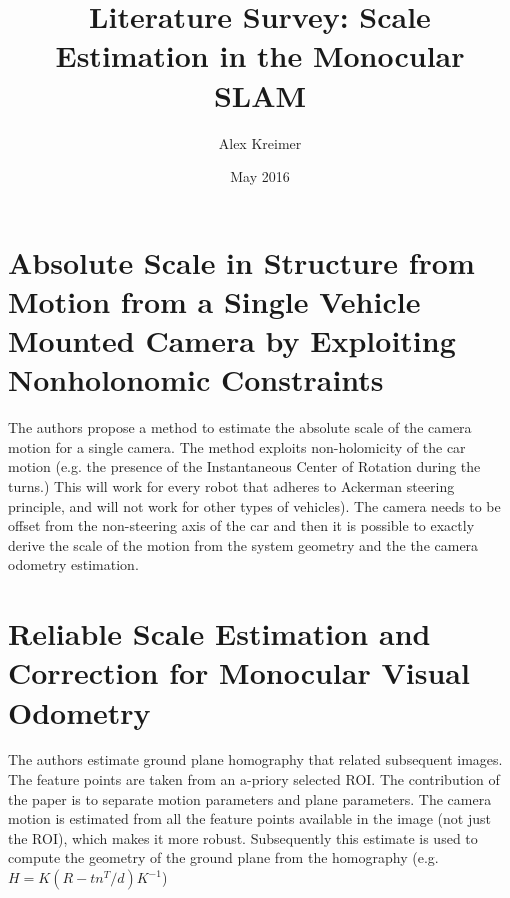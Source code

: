 \documentclass{article}
\title{Literature Survey: Scale Estimation in the Monocular SLAM}
\author{Alex Kreimer}
\date{May 2016}
\begin{document}
\maketitle

\section{Absolute Scale in Structure from Motion from a Single Vehicle
  Mounted Camera by Exploiting Nonholonomic
  Constraints~\cite{scaramuzza2009absolute}}

The authors propose a method to estimate the absolute scale of the
camera motion for a single camera.  The method exploits non-holomicity
of the car motion (e.g. the presence of the Instantaneous Center of
Rotation during the turns.) This will work for every robot that
adheres to Ackerman steering principle, and will not work for other
types of vehicles). The camera needs to be offset from the
non-steering axis of the car and then it is possible to exactly derive
the scale of the motion from the system geometry and the the camera
odometry estimation.

\section{Reliable Scale Estimation and Correction for Monocular Visual Odometry}

The authors estimate ground plane homography that related subsequent
images.  The feature points are taken from an a-priory selected ROI.
The contribution of the paper is to separate motion parameters and
plane parameters.  The camera motion is estimated from all the feature
points available in the image (not just the ROI), which makes it more
robust.  Subsequently this estimate is used to compute the geometry of
the ground plane from the homography (e.g. $H = K(R-tn^T/d)K^{-1}$)

{} 
\end{document}
